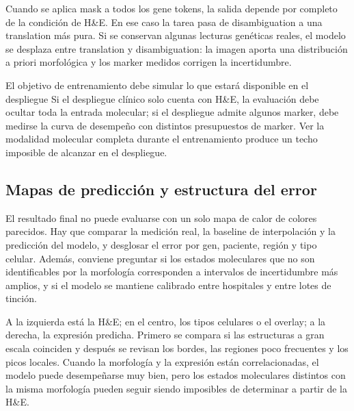
Cuando se aplica mask a todos los gene tokens, la salida depende por completo de la condición de H\&E. En ese caso la tarea pasa de disambiguation a una translation más pura. Si se conservan algunas lecturas genéticas reales, el modelo se desplaza entre translation y disambiguation: la imagen aporta una distribución a priori morfológica y los marker medidos corrigen la incertidumbre.

\begin{importantbox}{El objetivo de entrenamiento debe simular lo que estará disponible en el despliegue}
Si el despliegue clínico solo cuenta con H\&E, la evaluación debe ocultar toda la entrada molecular; si el despliegue admite algunos marker, debe medirse la curva de desempeño con distintos presupuestos de marker. Ver la modalidad molecular completa durante el entrenamiento produce un techo imposible de alcanzar en el despliegue.
\end{importantbox}

\subsection{Mapas de predicción y estructura del error}

El resultado final no puede evaluarse con un solo mapa de calor de colores parecidos. Hay que comparar la medición real, la baseline de interpolación y la predicción del modelo, y desglosar el error por gen, paciente, región y tipo celular. Además, conviene preguntar si los estados moleculares que no son identificables por la morfología corresponden a intervalos de incertidumbre más amplios, y si el modelo se mantiene calibrado entre hospitales y entre lotes de tinción.


A la izquierda está la H\&E; en el centro, los tipos celulares o el overlay; a la derecha, la expresión predicha. Primero se compara si las estructuras a gran escala coinciden y después se revisan los bordes, las regiones poco frecuentes y los picos locales. Cuando la morfología y la expresión están correlacionadas, el modelo puede desempeñarse muy bien, pero los estados moleculares distintos con la misma morfología pueden seguir siendo imposibles de determinar a partir de la H\&E.

